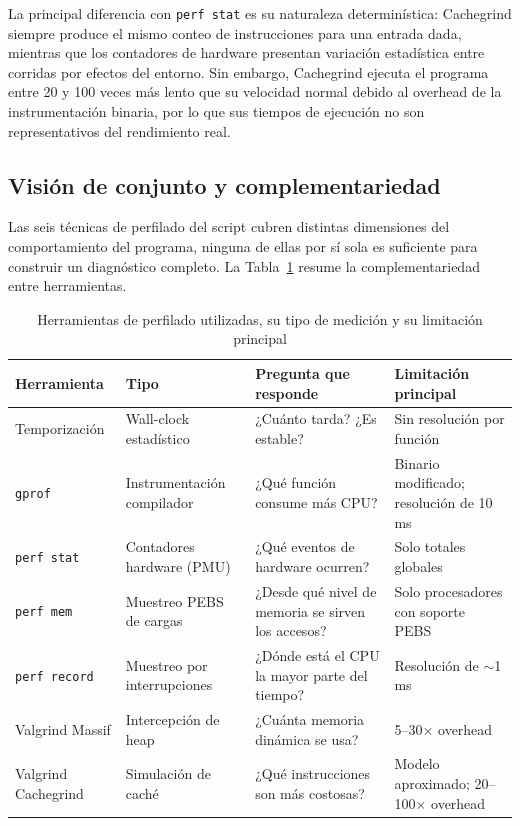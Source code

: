 La principal diferencia con \texttt{perf stat} es su naturaleza determinística:
Cachegrind siempre produce el mismo conteo de instrucciones para una entrada dada,
mientras que los contadores de hardware presentan variación estadística entre
corridas por efectos del entorno.
Sin embargo, Cachegrind ejecuta el programa entre 20 y 100 veces más lento que
su velocidad normal debido al overhead de la instrumentación binaria, por lo que
sus tiempos de ejecución no son representativos del rendimiento real.


\subsection{Visión de conjunto y complementariedad}

Las seis técnicas de perfilado del script cubren distintas dimensiones del
comportamiento del programa, ninguna de ellas por sí sola es suficiente para
construir un diagnóstico completo.
La Tabla~\ref{tab:profiling_tools} resume la complementariedad entre herramientas.

\begin{table}[H]
\centering
\caption{Herramientas de perfilado utilizadas, su tipo de medición y su limitación principal}
\label{tab:profiling_tools}
\begin{tabular}{p{2.8cm}p{3.0cm}p{4.5cm}p{3.5cm}}
\toprule
\textbf{Herramienta} & \textbf{Tipo} & \textbf{Pregunta que responde} & \textbf{Limitación principal} \\
\midrule
Temporización    & Wall-clock estadístico    & ¿Cuánto tarda? ¿Es estable? & Sin resolución por función \\
\texttt{gprof}   & Instrumentación compilador & ¿Qué función consume más CPU? & Binario modificado; resolución de 10\,ms \\
\texttt{perf stat} & Contadores hardware (PMU) & ¿Qué eventos de hardware ocurren? & Solo totales globales \\
\texttt{perf mem}    & Muestreo PEBS de cargas   & ¿Desde qué nivel de memoria se sirven los accesos? & Solo procesadores con soporte PEBS \\
\texttt{perf record} & Muestreo por interrupciones & ¿Dónde está el CPU la mayor parte del tiempo? & Resolución de $\sim$1\,ms \\
Valgrind Massif  & Intercepción de heap       & ¿Cuánta memoria dinámica se usa? & 5--30$\times$ overhead \\
Valgrind Cachegrind & Simulación de caché     & ¿Qué instrucciones son más costosas? & Modelo aproximado; 20--100$\times$ overhead \\
\bottomrule
\end{tabular}
\end{table}


